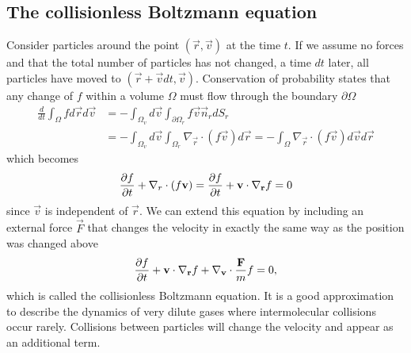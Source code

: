 \subsection{The collisionless Boltzmann equation}
Consider particles around the point $(\vec r,\vec v)$ at the time $t$. If we assume no forces and that the total number of particles has not changed, a time $dt$ later, all particles have moved to $(\vec r + \vec vdt, \vec v)$. Conservation of probability states that any change of $f$ within a volume $\Omega$ must flow through the boundary $\partial \Omega$
\begin{align}
	\frac{d}{ dt}\int_\Omega f d\vec r d\vec v &= -\int_{\Omega_v}d\vec v\int_{\partial \Omega_r} f\vec v \vec n_r dS_r\\
	&= -\int_{\Omega_v}d\vec v\int_{\Omega_r} \nabla_\vec r\cdot(f\vec v) d\vec r = -\int_{\Omega} \nabla_\vec r\cdot(f\vec v) d\vec vd\vec r
\end{align}
which becomes
\begin{align}
	\frac{\partial f}{\partial t} + \nabla_r \cdot(f\mathbf v) = \frac{\partial f}{\partial t} + \mathbf v\cdot\nabla_\mathbf r f = 0
\end{align}
since $\vec v$ is independent of $\vec r$. We can extend this equation by including an external force $\vec F$ that changes the velocity in exactly the same way as the position was changed above
\begin{align}
	\label{eq:collisionless_boltzmann}
	\frac{\partial f}{\partial t} + \mathbf v\cdot\nabla_\mathbf r f + \nabla_\mathbf v \cdot \frac{\mathbf F}{ m}f = 0,
\end{align}
which is called the collisionless Boltzmann equation. It is a good approximation to describe the dynamics of very dilute gases where intermolecular collisions occur rarely. Collisions between particles will change the velocity and appear as an additional term.
